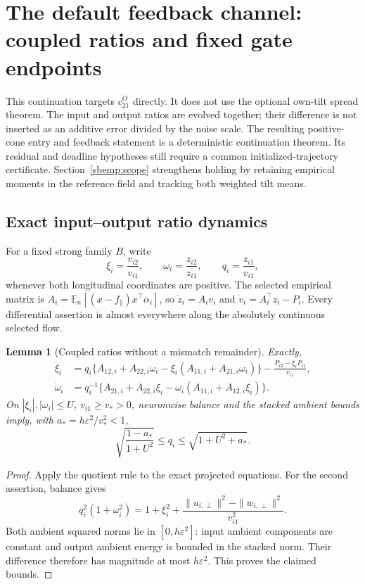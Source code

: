 \documentclass{article} %
\theoremstyle{plain}
\newtheorem{lemma}[theorem]{Lemma}
\theoremstyle{definition}
\theoremstyle{remark}
\begin{document}
\section{The default feedback channel: coupled ratios and fixed gate endpoints}
\label{sbpos:scope}

This continuation targets $c_{21}^O$ directly. It does not use the optional
own-tilt spread theorem. The input and output ratios are evolved together;
their difference is not inserted as an additive error divided by the noise
scale. The resulting positive-cone entry and feedback statement is a
deterministic continuation theorem. Its residual and deadline hypotheses
still require a common initialized-trajectory certificate.
Section~\ref{sbemp:scope} strengthens holding by retaining empirical
moments in the reference field and tracking both weighted tilt means.

\subsection{Exact input--output ratio dynamics}

For a fixed strong family $B$, write
\[
 \xi_i=\frac{v_{i2}}{v_{i1}},\qquad
 \omega_i=\frac{z_{i2}}{z_{i1}},\qquad
 q_i=\frac{z_{i1}}{v_{i1}},
\]
whenever both longitudinal coordinates are positive. The selected empirical
matrix is $A_i=\mathbb E_n[(x-f_\parallel)x^\top\alpha_i]$, so
$\dot z_i=A_iv_i$ and $\dot v_i=A_i^\top z_i-P_i$.
Every differential assertion is almost everywhere along the absolutely
continuous selected flow.

\begin{lemma}[Coupled ratios without a mismatch remainder]
\label{sbpos:ratios}
Exactly,
\begin{align}
 \dot\xi_i
 &=q_i\{A_{12,i}+A_{22,i}\omega_i
                 -\xi_i(A_{11,i}+A_{21,i}\omega_i)\}
       -\frac{P_{i2}-\xi_iP_{i1}}{v_{i1}},\label{sbpos:input-ratio}\\
 \dot\omega_i
 &=q_i^{-1}\{A_{21,i}+A_{22,i}\xi_i
                 -\omega_i(A_{11,i}+A_{12,i}\xi_i)\}.
 \label{sbpos:output-ratio}
\end{align}
On $|\xi_i|,|\omega_i|\le U$, $v_{i1}\ge v_*>0$, neuronwise balance
and the stacked ambient bounds imply, with
$a_*=h\varepsilon^2/v_*^2<1$,
\begin{equation}\label{sbpos:q-bounds}
 \sqrt{\frac{1-a_*}{1+U^2}}\le q_i
           \le\sqrt{1+U^2+a_*}.
\end{equation}
\end{lemma}
\begin{proof}
Apply the quotient rule to the exact projected equations.
For the second assertion, balance gives
\[
 q_i^2(1+\omega_i^2)=1+\xi_i^2+
       \frac{\|u_{i,\perp}\|^2-\|w_{i,\perp}\|^2}{v_{i1}^2}.
\]
Both ambient squared norms lie in $[0,h\varepsilon^2]$:
input ambient components are constant and output ambient energy is bounded
in the stacked norm. Their difference therefore has magnitude at most
$h\varepsilon^2$. This proves the claimed bounds.
\end{proof}
\end{document}

